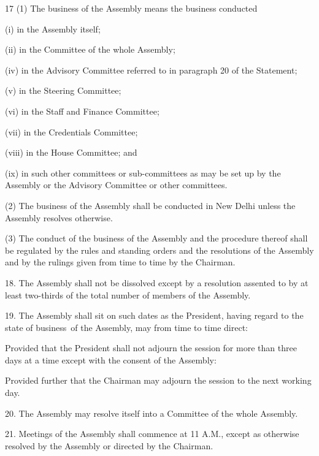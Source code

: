17 (1) The business of the Assembly means the business conducted\textemdash{}



(i) in the Assembly itself;

(ii) in the Committee of the whole Assembly;

(iv) in the Advisory Committee referred to in paragraph 20 of the Statement;

(v) in the Steering Committee;

(vi) in the Staff and Finance Committee;

(vii) in the Credentials Committee;

(viii) in the House Committee; and

(ix) in such other committees or sub-committees as may be set up by the Assembly or the Advisory Committee or other committees.



(2) The business of the Assembly shall be conducted in New Delhi unless the Assembly resolves otherwise.



(3) The conduct of the business of the Assembly and the procedure thereof shall be regulated by the rules and standing orders and the resolutions of the Assembly and by the rulings given from time to time by the Chairman.



18. The Assembly shall not be dissolved except by a resolution assented to by at least two-thirds of the total number of members of the Assembly.



19. The Assembly shall sit on such dates as the President, having regard to the state of business~of the Assembly, may from time to time direct:



Provided that the President shall not adjourn the session for more than three days at a time except with the consent of the Assembly:



Provided further that the Chairman may adjourn the session to the next working day.



20. The Assembly may resolve itself into a Committee of the whole Assembly.



21. Meetings of the Assembly shall commence at 11 A.M., except as otherwise resolved by the Assembly or directed by the Chairman.



